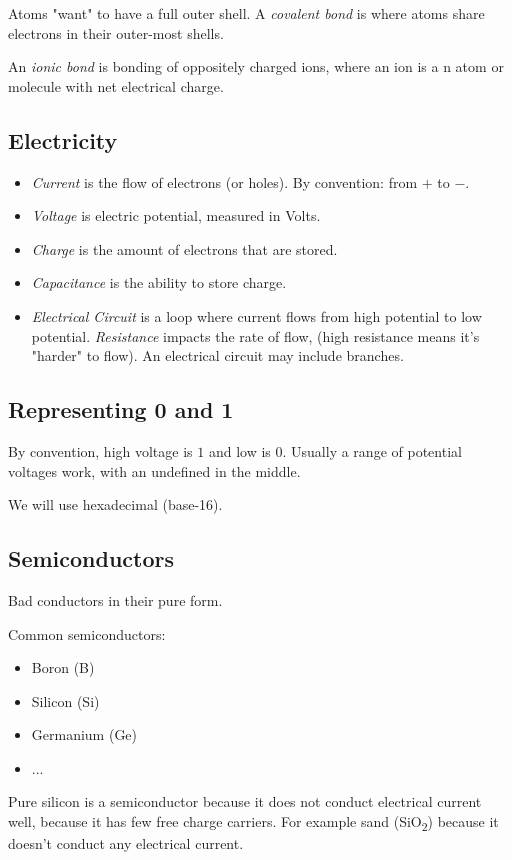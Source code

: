 \documentclass[00_complete]{subfiles}
\begin{document}
Atoms "want" to have a full outer shell. A \textit{covalent bond} is where atoms
share electrons in their outer-most shells.

An \textit{ionic bond} is bonding of oppositely charged ions, where an ion is a
n atom or molecule with net electrical charge.

\subsection{Electricity}
\begin{itemize}
    \item \textit{Current} is the flow of electrons (or holes). By convention:
        from $+$ to $-$.
    \item \textit{Voltage} is electric potential, measured in Volts. 
    \item \textit{Charge} is the amount of electrons that are stored.
    \item \textit{Capacitance} is the ability to store charge.
        \item \textit{Electrical Circuit} is a loop where current flows from
            high potential to low potential. \textit{Resistance} impacts the
            rate of flow, (high resistance means it's "harder" to flow). An
            electrical circuit may include branches.
\end{itemize}
\subsection{Representing 0 and 1}
By convention, high voltage is $1$ and low is $0$. Usually a range of potential
voltages work, with an undefined in the middle.

We will use hexadecimal (base-16).
\subsection{Semiconductors}
Bad conductors in their pure form.

Common semiconductors:
\begin{itemize}
    \item Boron (B)
    \item Silicon (Si)
    \item Germanium (Ge)
    \item ...
\end{itemize}
Pure silicon is a semiconductor because it does not conduct electrical current
well, because it has few free charge carriers.
For example sand (SiO\textsubscript{2}) because it doesn't conduct any electrical current.
\end{document}
